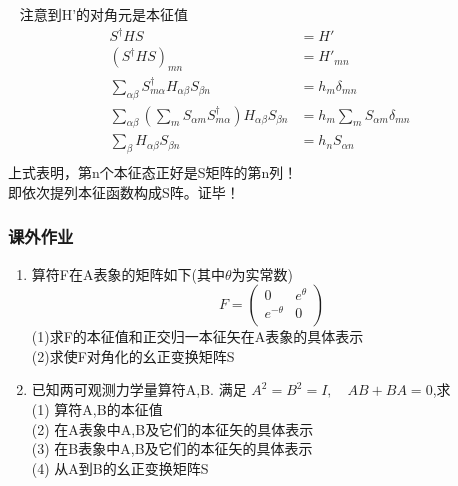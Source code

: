 \begin{frame}
    \例[23、试证明F在A表象的本征函数系构成这个S矩阵]{}
    \证~ 注意到H'的对角元是本征值
    \begin{equation*}
    \begin{split}
   S^\dagger H S &= H' \\
    (S^\dagger H S)_{mn}  &= H'_{mn}\\
    \sum_{\alpha \beta} S^{\dagger} _{m \alpha} H_{\alpha \beta} S_{\beta n} & = h_m \delta_{mn} \\
    \sum_{\alpha \beta} (\sum_m S_{\alpha m} S^\dagger_{m \alpha}) H_{\alpha \beta} S_{\beta n} &= h_m \sum_m S_{\alpha m}\delta_{mn} \\
    \sum_{\beta} H_{\alpha \beta} S_{\beta n} &= h_n S_{\alpha n} \\
    \end{split} 
    \end{equation*} 
    上式表明，第n个本征态正好是S矩阵的第n列！\\
    即依次提列本征函数构成S阵。证毕！
\end{frame} 

\begin{frame}
    \frametitle{课外作业}
    \begin{enumerate}
        \item 算符F在A表象的矩阵如下(其中$\theta$为实常数) \\ 
        \[ F= \begin{pmatrix}
          0 & e^{\theta} \\
          e^{-\theta} & 0 \\
        \end{pmatrix} \]
        (1)求F的本征值和正交归一本征矢在A表象的具体表示\\
        (2)求使F对角化的幺正变换矩阵S
        \item 已知两可观测力学量算符A,B. 满足 $A^2=B^2=I, \quad AB+BA=0$,求 \\ 
              (1) 算符A,B的本征值 \\ 
              (2) 在A表象中A,B及它们的本征矢的具体表示 \\ 
              (3) 在B表象中A,B及它们的本征矢的具体表示 \\ 
              (4) 从A到B的幺正变换矩阵S
    \end{enumerate}
\end{frame}

